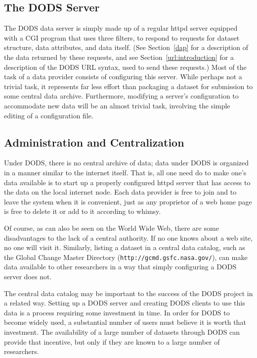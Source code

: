 \subsection{The DODS Server}
\label{dods server}

The DODS data server is simply made up of a regular httpd server
equipped with a CGI program that uses three filters, to respond to
requests for dataset structure, data attributes, and data itself. (See
Section~\ref{dap} for a description of the data returned by these
requests, and see Section~\ref{url:introduction} for a description of
the DODS URL syntax, used to send these requests.) Most of the task of
a data provider consists of configuring this server. While perhaps not
a trivial task, it represents far less effort than packaging a dataset
for submission to some central data archive. Furthermore, modifying a
server's configuration to accommodate new data will be an almost
trivial task, involving the simple editing of a configuration file.

\subsection{Administration and Centralization}

Under DODS, there is no central archive of data; data under DODS is
organized in a manner similar to the internet itself. That is, all one
need do to make one's data available is to start up a properly
configured httpd server that has access to the data on the local
internet node. Each data provider is free to join and to leave the
system when it is convenient, just as any proprietor of a web home
page is free to delete it or add to it according to whimsy.

Of course, as can also be seen on the World Wide Web, there are some
disadvantages to the lack of a central authority. If no one knows
about a web site, no one will visit it. Similarly, listing a dataset
in a central data catalog, such as the Global Change Master Directory
({\tt http://gcmd.gsfc.nasa.gov/}), can make data available to other
researchers in a way that simply configuring a DODS server does not.

The central data catalog may be important to the success of the DODS
project in a related way. Setting up a DODS server and creating DODS
clients to use this data is a process requiring some investment in
time. In order for DODS to become widely used, a substantial number of
users must believe it is worth that investment. The availability of
a large number of datasets through DODS can provide that incentive,
but only if they are known to a large number of researchers.

